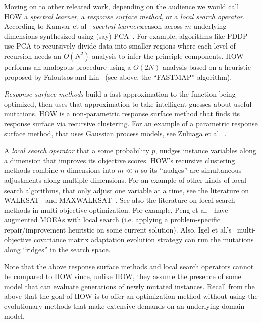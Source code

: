 Moving on to other releated work, depending on the audience  we would
 call HOW a {\em spectral learner}, 
a {\em response surface method}, or  a {\em local search operator}.
According to
Kamvar et al~\cite{kamvar03}
{\em spectral learners}reason across $m$ underlying dimensions synthesized
using (say) PCA~\cite{pearson1901}. For example,
algorithms like PDDP~\cite{boley98} use PCA to
recursively divide data into smaller regions where each level of recursion needs an   $O(N^2)$ analysis
to infer the principle components. HOW performs an analogous procedure using a   $O(2N)$ analysis
based on a heuristic proposed by
Faloutsos and Lin~\cite{Faloutsos1995} (see above, the ``FASTMAP'' algorithm).

{\em Response surface methods}  build a fast approximation to the function being optimized,
then uses that  approximation to take intelligent guesses about useful mutations. HOW
is a non-parametric response surface method that finds its response surface via recursive
clustering. For an example of a parametric response surface method, that uses Gaussian process
models, see Zuluaga et al.~\cite{zuluaga13}.

A {\em local search operator} that a some probability $p$, nudges  instance variables
along a dimension that improves its objective scores. HOW's recursive clustering methods
combine $n$ dimensions into $m \ll n$ so its ``nudges'' are simultaneous
adjustments along multiple dimensions. For an example of other kinds of local search algorithms, that only adjust
one variable at a time, see the literature on WALKSAT~\cite{Selman1992} and MAXWALKSAT~\cite{kautz97}.
See also the literature on local search methods in multi-objective optimization.
For example,
Peng et al.~\cite{peng09:ls} have augmented MOEAs with
local search  (i.e. applying a problem-specific repair/improvement
heuristic on some current solution).
Also, Igel et al.'s~\cite{igel07} multi-objective
covariance matrix adaptation evolution strategy
can run the mutations along  ``ridges'' in the search space.

Note that the above response surface methods and local search operators cannot be compared to HOW
since, unlike HOW, they assume the presence of some model that can evaluate generations of newly mutated
instances. Recall from the above that the goal of HOW is to offer an optimization method without
using the evolutionary methods that make extensive demands on an underlying domain model.
